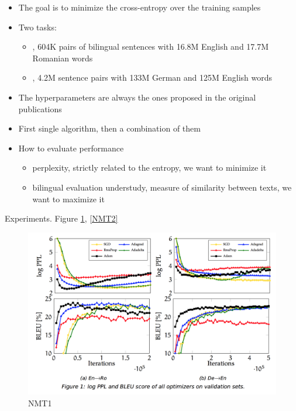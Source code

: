 \documentclass[english]{article}
\begin{document}
\begin{itemize}
\item The goal is to minimize the cross-entropy over the training samples 
\item Two tasks: 
\begin{itemize}
\item {}, 604K pairs of bilingual sentences with 16.8M English and 17.7M Romanian words
\item {}, 4.2M sentence pairs with 133M German and 125M English words
\end{itemize}


\item The hyperparameters are always the ones proposed in the original publications 
\item First single algorithm, then a combination of them

\item How to evaluate performance
\begin{itemize}
\item {} perplexity, strictly related to the entropy, we want to minimize it
\item {} bilingual evaluation understudy, measure of similarity between texts, we want to maximize it
\end{itemize}
\end{itemize}

\item Experiments. Figure \ref{NMT1}, \ref{NMT2}




\begin{figure}
 \centering
\includegraphics[width = \textwidth]{NMT1.png}
\caption{NMT1}
\label{NMT1}
\end{figure}
\end{document}
